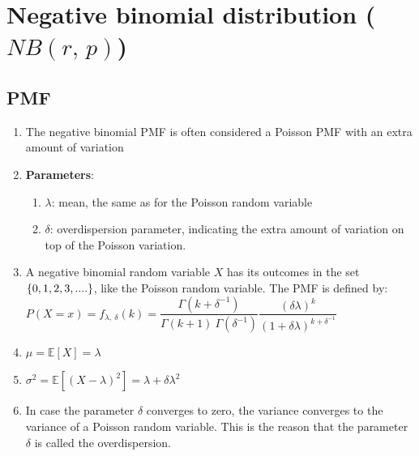\section{Negative binomial distribution ($ {\displaystyle  {NB} (r,\,p)}$)}


\subsection{PMF}

\begin{enumerate}
    \item The negative binomial PMF is often considered a Poisson PMF with an extra amount of variation
    \hfill \cite{statistics/book/Statistics-for-Data-Scientists/Maurits-Kaptein}

    \item \textbf{Parameters}:
    \begin{enumerate}
        \item $\lambda$: mean, the same as for the Poisson random variable
        \hfill \cite{statistics/book/Statistics-for-Data-Scientists/Maurits-Kaptein}

        \item $\delta$: overdispersion parameter, indicating the extra amount of variation on top of the Poisson variation.
        \hfill \cite{statistics/book/Statistics-for-Data-Scientists/Maurits-Kaptein}
    \end{enumerate}

    \item A negative binomial random variable $X$ has its outcomes in the set $\left\{0, 1, 2, 3, ....\right\}$, like the Poisson random variable.
    The PMF is defined by:
    \hfill \cite{statistics/book/Statistics-for-Data-Scientists/Maurits-Kaptein}
    \\
    $
        P(X=x)
        = f_{\lambda,\ \delta}(k)
        = \dfrac{\Gamma(k + \delta^{-1})}{\Gamma(k + 1)\ \Gamma(\delta^{-1})}
        \dfrac{(\delta\lambda)^k}{(1+\delta\lambda)^{k+\delta^{-1}}}
    $
    \hfill \cite{statistics/book/Statistics-for-Data-Scientists/Maurits-Kaptein}


    \item $\mu = \mathbb{E}[X] = \lambda$
    \hfill \cite{statistics/book/Statistics-for-Data-Scientists/Maurits-Kaptein}

    \item $\sigma^2 = \mathbb{E}[(X - \lambda)^2] = \lambda + \delta\lambda^2$
    \hfill \cite{statistics/book/Statistics-for-Data-Scientists/Maurits-Kaptein}

    \item In case the parameter $\delta$ converges to zero, the variance converges to the variance of a Poisson random variable.
    This is the reason that the parameter $\delta$ is called the overdispersion.
\end{enumerate}




